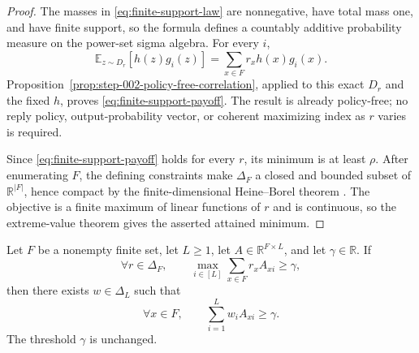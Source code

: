 \begin{proof}
The masses in \eqref{eq:finite-support-law} are nonnegative, have total mass
one, and have finite support, so the formula defines a countably additive
probability measure on the power-set sigma algebra.  For every $i$,
\[
\mathbb E_{z\sim D_r}[h(z)g_i(z)]
=\sum_{x\in F}r_xh(x)g_i(x).
\]
Proposition~\ref{prop:step-002-policy-free-correlation}, applied to this exact
$D_r$ and the fixed $h$, proves \eqref{eq:finite-support-payoff}.  The result
is already policy-free; no reply policy, output-probability vector, or
coherent maximizing index as $r$ varies is required.

Since \eqref{eq:finite-support-payoff} holds for every $r$, its minimum is at
least $\rho$.  After enumerating $F$, the defining constraints make
$\Delta_F$ a closed and bounded subset of $\mathbb R^{|F|}$, hence compact by
the finite-dimensional Heine--Borel theorem
\citep[Theorem~2.41]{rudin1976principles}.  The objective is a finite maximum
of linear functions of $r$ and is continuous, so the extreme-value theorem
\citep[Theorem~4.16]{rudin1976principles} gives the asserted attained minimum.
\end{proof}

\begin{lemma}
\label{lem:step-003-convex-hull-alternative}
Let $F$ be a nonempty finite set, let $L\ge1$, let
$A\in\mathbb R^{F\times L}$, and let $\gamma\in\mathbb R$.  If
\begin{equation}\label{eq:convex-hull-premise}
\forall r\in\Delta_F,\qquad
\max_{i\in[L]}\sum_{x\in F}r_xA_{xi}\ge\gamma,
\end{equation}
then there exists $w\in\Delta_L$ such that
\begin{equation}\label{eq:convex-hull-conclusion}
\forall x\in F,\qquad
\sum_{i=1}^Lw_iA_{xi}\ge\gamma.
\end{equation}
The threshold $\gamma$ is unchanged.
\end{lemma}

